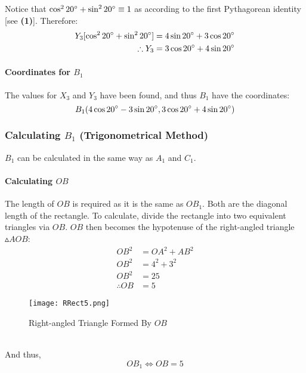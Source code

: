 \documentclass{article}
\begin{document}
            Notice that $\cos^2{20\degree} + \sin^2{20\degree} \equiv 1$ as according to the first Pythagorean identity [see \textbf{(1)}]. Therefore:
            \begin{align*}
                Y_3[\cos^2{20\degree} + \sin^2{20\degree}] &= 4\sin{20\degree} + 3\cos{20\degree} \\
                \therefore Y_3 &= 3\cos{20\degree} + 4\sin{20\degree}
            \end{align*}
            \paragraph{Coordinates for $B_1$} The values for $X_3$ and $Y_3$ have been found, and thus $B_1$ have the coordinates:
            \begin{equation}
                B_1(4\cos{20\degree} - 3\sin{20\degree}, 3\cos{20\degree} + 4\sin{20\degree})
            \end{equation} \newpage
            \subsubsection{Calculating $B_1$ (Trigonometrical Method)} $B_1$ can be calculated in the same way as $A_1$ and $C_1$.
            \paragraph{Calculating $OB$} The length of $OB$ is required as it is the same as $OB_1$. Both are the diagonal length of the rectangle. To calculate, divide the rectangle into two equivalent triangles via $OB$. $OB$ then becomes the hypotenuse of the right-angled triangle $\vartriangle{AOB}$:
            \begin{align*}
                OB^2 &= OA^2 + AB^2 \\
                OB^2 &= 4^2 + 3^2 \\
                OB^2 &= 25 \\
                \therefore OB &= 5
            \end{align*}
            \begin{figure}[h!]
                \texttt{[image: RRect5.png]}
                \caption{Right-angled Triangle Formed By $OB$}
                \label{fig:rrect5}
            \end{figure} \\
            And thus,
            \begin{equation}
                OB_1 \Leftrightarrow OB = 5
            \end{equation}
\end{document}
